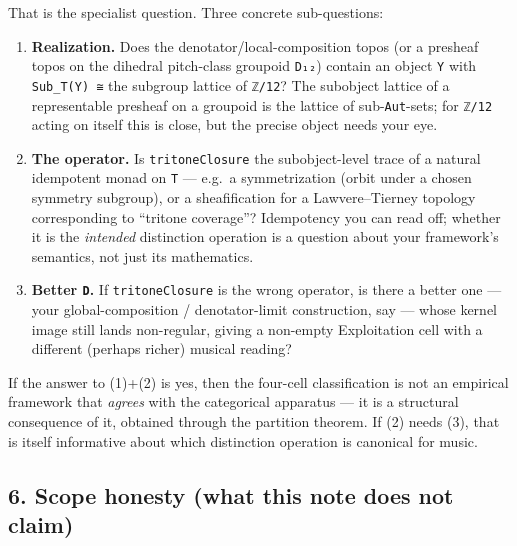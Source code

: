 \documentclass[
  11pt,
]{article}
\providecommand{\tightlist}{%
  \setlength{\itemsep}{0pt}\setlength{\parskip}{0pt}}
\begin{document}
That is the specialist question. Three concrete sub-questions:

\begin{enumerate}
\def\labelenumi{\arabic{enumi}.}
\tightlist
\item
  \textbf{Realization.} Does the denotator/local-composition topos (or a
  presheaf topos on the dihedral pitch-class groupoid \texttt{D₁₂})
  contain an object \texttt{Y} with \texttt{Sub\_T(Y)\ ≅} the subgroup
  lattice of \texttt{ℤ/12}? The subobject lattice of a representable
  presheaf on a groupoid is the lattice of sub-\texttt{Aut}-sets; for
  \texttt{ℤ/12} acting on itself this is close, but the precise object
  needs your eye.
\item
  \textbf{The operator.} Is \texttt{tritoneClosure} the subobject-level
  trace of a natural idempotent monad on \texttt{T} --- e.g.~a
  symmetrization (orbit under a chosen symmetry subgroup), or a
  sheafification for a Lawvere--Tierney topology corresponding to
  ``tritone coverage''? Idempotency you can read off; whether it is the
  \emph{intended} distinction operation is a question about your
  framework's semantics, not just its mathematics.
\item
  \textbf{Better \texttt{D}.} If \texttt{tritoneClosure} is the wrong
  operator, is there a better one --- your global-composition /
  denotator-limit construction, say --- whose kernel image still lands
  non-regular, giving a non-empty Exploitation cell with a different
  (perhaps richer) musical reading?
\end{enumerate}

If the answer to (1)+(2) is yes, then the four-cell classification is
not an empirical framework that \emph{agrees} with the categorical
apparatus --- it is a structural consequence of it, obtained through the
partition theorem. If (2) needs (3), that is itself informative about
which distinction operation is canonical for music.

\subsection{6. Scope honesty (what this note does not
claim)}\label{scope-honesty-what-this-note-does-not-claim}
\end{document}
